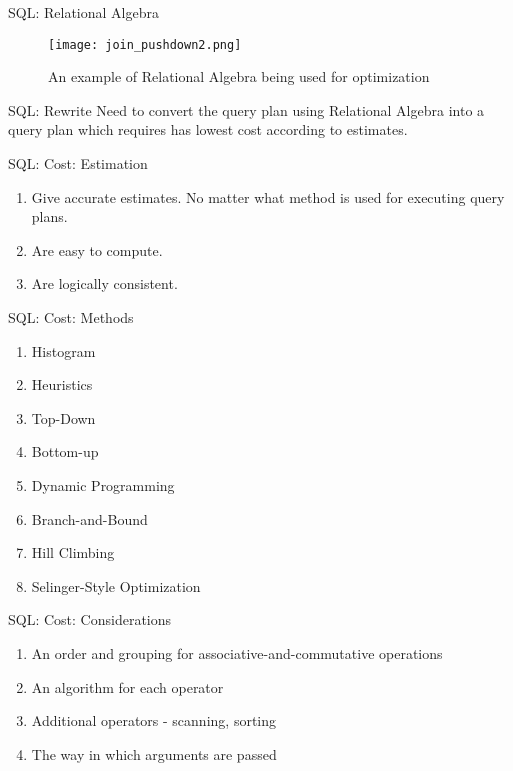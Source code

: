 \begin{frame}{SQL: Relational Algebra}
    \begin{figure}
        \centering
        \texttt{[image: join\_pushdown2.png]}\\
        \caption{An example of Relational Algebra being used for optimization}
        \label{fig:j_2}
    \end{figure}
\end{frame}

\begin{frame}{SQL: Rewrite}
    Need to convert the query plan using Relational Algebra into a query plan which requires has lowest cost according to estimates.
\end{frame}

\begin{frame}{SQL: Cost: Estimation}
    \begin{enumerate}
        \item Give accurate estimates. No matter what method is used for executing query plans.
        \item Are easy to compute.
        \item Are logically consistent.
    \end{enumerate}
\end{frame}

\begin{frame}{SQL: Cost: Methods}
    \begin{enumerate}
        \item Histogram
        \item Heuristics
        \item Top-Down
        \item Bottom-up
        \item Dynamic Programming
        \item Branch-and-Bound
        \item Hill Climbing
        \item Selinger-Style Optimization
    \end{enumerate}
\end{frame}

\begin{frame}{SQL: Cost: Considerations}
    \begin{enumerate}
        \item An order and grouping for associative-and-commutative operations
        \item An algorithm for each operator
        \item Additional operators - scanning, sorting
        \item The way in which arguments are passed    
    \end{enumerate}
\end{frame}

